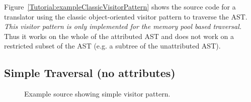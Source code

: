 
Figure~\ref{Tutorial:exampleClassicVisitorPattern} shows the source code 
for a translator using the classic object-oriented visitor pattern 
to traverse the AST.  {\em This visitor pattern is only implemented
for the memory pool based traversal.}  Thus it works on the whole
of the attributed AST and does not work on a restricted subset of 
the AST (e.g. a subtree of the unattributed AST).


\subsection{Simple Traversal (no attributes)}
\label{ASTSimpleProcessing_traversal}

\begin{figure}[!h]
{\indent
{\mySmallFontSize

\begin{latexonly}
   
\end{latexonly}

\begin{htmlonly}
   
\end{htmlonly}

}
}
\caption{Example source showing simple visitor pattern.}
\label{Tutorial:exampleVisitorTraversal}
\end{figure}


